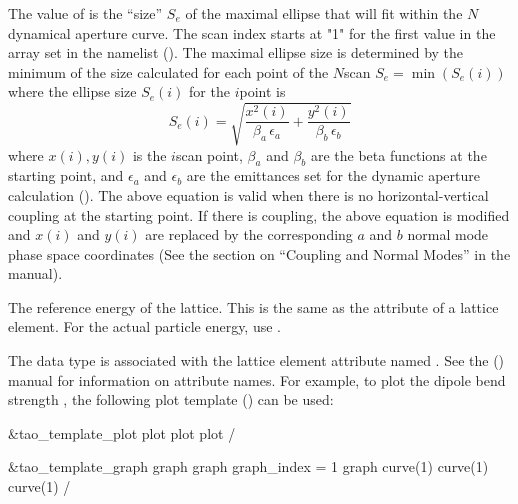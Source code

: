 \begin{description}
{{{{{  %
  \item[dynamic_aperture.$N$, $N = 1, 2, 3 \ldots$] \Newline {}
The value of  is the ``size'' $S_e$ of the maximal ellipse that will fit
within the $N$\Th dynamical aperture curve. The scan index starts at "1" for the first value in the
 array set in the  namelist (). The maximal
ellipse size is determined by the minimum of the size calculated for each point of the $N$\Th scan
$S_e = \min(S_e(i))$ where the ellipse size $S_e(i)$ for the $i$\Th point is
\begin{equation}
  S_e(i) = \sqrt{ \frac{x^2(i)}{\beta_a \, \epsilon_a} + \frac{y^2(i)}{\beta_b \, \epsilon_b} }
\end{equation} 
where $x(i), y(i)$ is the $i$\Th scan point, $\beta_a$ and $\beta_b$ are the beta functions at the
starting point, and $\epsilon_a$ and $\epsilon_b$ are the emittances set for the dynamic aperture
calculation (). The above equation is valid when there is no horizontal-vertical
coupling at the starting point. If there is coupling, the above equation is modified and $x(i)$ and
$y(i)$ are replaced by the corresponding $a$ and $b$ normal mode phase space coordinates (See the section
on ``Coupling and Normal Modes'' in the \bmad manual).

  \item[e_tot_ref] \Newline {}
The reference energy of the lattice. This is the same as the  attribute of a lattice element.
For the actual particle energy, use .

  \item[element_attrib.<attrib_name>] \Newline {}
The  data type is associated with the
lattice element attribute named . See the \bmad
(\cite{b:bmad}) manual for information on attribute names. For
example, to plot the dipole bend strength , the following
plot template () can be used:
\begin{example}
  &tao_template_plot
    plot%
    plot%
    plot%
  /

  &tao_template_graph
    graph%
    graph%
    graph_index = 1
    graph%
    curve(1)%
    curve(1)%
    curve(1)%
  /
\end{example}

}}}}}
\end{description}
